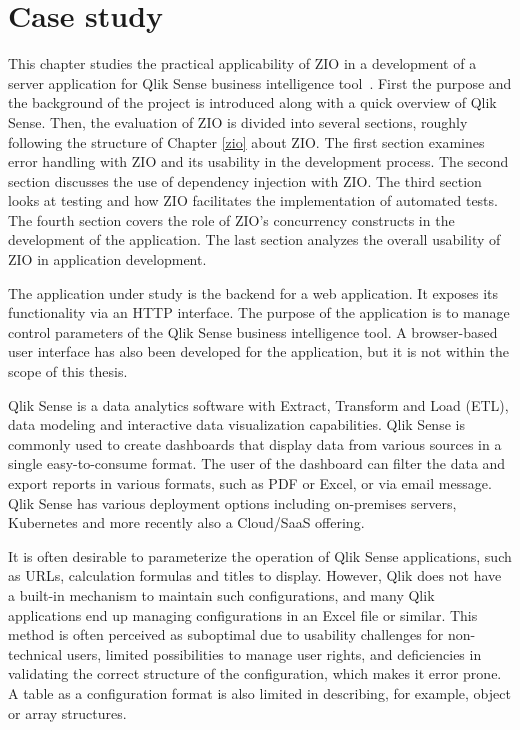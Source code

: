\chapter{Case study}
This chapter studies the practical applicability of ZIO in a development of a server application for Qlik Sense business intelligence tool~\cite{qlik-sense}. First the purpose and the background of the project is introduced along with a quick overview of Qlik Sense. Then, the evaluation of ZIO is divided into several sections, roughly following the structure of Chapter \ref{zio} about ZIO. The first section examines error handling with ZIO and its usability in the development process. The second section discusses the use of dependency injection with ZIO. The third section looks at testing and how ZIO facilitates the implementation of automated tests. The fourth section covers the role of ZIO's concurrency constructs in the development of the application. The last section analyzes the overall usability of ZIO in application development.

The application under study is the backend for a web application. It exposes its functionality via an HTTP interface. The purpose of the application is to manage control parameters of the Qlik Sense business intelligence tool. A browser-based user interface has also been developed for the application, but it is not within the scope of this thesis.

Qlik Sense is a data analytics software with Extract, Transform and Load (ETL), data modeling and interactive data visualization capabilities. Qlik Sense is commonly used to create dashboards that display data from various sources in a single easy-to-consume format. The user of the dashboard can filter the data and export reports in various formats, such as PDF or Excel, or via email message. Qlik Sense has various deployment options including on-premises servers, Kubernetes and more recently also a Cloud/SaaS offering.

It is often desirable to parameterize the operation of Qlik Sense applications, such as URLs, calculation formulas and titles to display. However, Qlik does not have a built-in mechanism to maintain such configurations, and many Qlik applications end up managing configurations in an Excel file or similar. This method is often perceived as suboptimal due to usability challenges for non-technical users, limited possibilities to manage user rights, and deficiencies in validating the correct structure of the configuration, which makes it error prone. A table as a configuration format is also limited in describing, for example, object or array structures.

